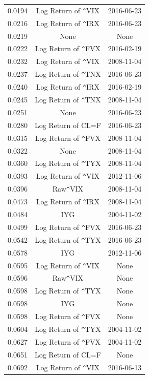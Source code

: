 \documentclass[11pt,3p,review,authoryear]{elsarticle}
\theoremstyle{definition}
\begin{document}
\begin{table}[ht]
\begin{tabular}{ccc}
      0.0194 & Log Return of \verb|^|VIX & 2016-06-23 \\ 
      0.0216 & Log Return of \verb|^|IRX & 2016-06-23 \\ 
      \rowcolor{yellow} 0.0219 & None & None \\ 
      0.0222 & Log Return of \verb|^|FVX & 2016-02-19 \\ 
      0.0232 & Log Return of \verb|^|VIX & 2008-11-04 \\ 
      0.0237 & Log Return of \verb|^|TNX & 2016-06-23 \\ 
      0.0240 & Log Return of \verb|^|IRX & 2016-02-19 \\ 
      0.0245 & Log Return of \verb|^|TNX & 2008-11-04 \\ 
      0.0251 & None & 2016-06-23 \\ 
      0.0280 & Log Return of CL=F & 2016-06-23 \\ 
      0.0315 & Log Return of \verb|^|FVX & 2008-11-04 \\ 
      0.0322 & None & 2008-11-04 \\ 
      0.0360 & Log Return of \verb|^|TYX & 2008-11-04 \\ 
      0.0393 & Log Return of \verb|^|VIX & 2012-11-06 \\ 
      0.0396 & Raw\verb|^|VIX & 2008-11-04 \\ 
      0.0473 & Log Return of \verb|^|IRX & 2008-11-04 \\ 
      0.0484 & IYG & 2004-11-02 \\ 
      0.0499 & Log Return of \verb|^|FVX & 2016-06-23 \\ 
      0.0542 & Log Return of \verb|^|TYX & 2016-06-23 \\ 
      0.0578 & IYG & 2012-11-06 \\ 
      0.0595 & Log Return of \verb|^|VIX & None \\ 
      0.0596 & Raw\verb|^|VIX & None \\ 
      0.0598 & Log Return of \verb|^|TYX & None \\ 
      0.0598 & IYG & None \\ 
      0.0598 & Log Return of \verb|^|FVX & None \\ 
      0.0604 & Log Return of \verb|^|TYX & 2004-11-02 \\ 
      0.0627 & Log Return of \verb|^|FVX & 2004-11-02 \\ 
      0.0651 & Log Return of CL=F & None \\ 
      0.0692 & Log Return of \verb|^|VIX & 2016-06-13 \\ 

\end{tabular}
\end{table}
\end{document}
